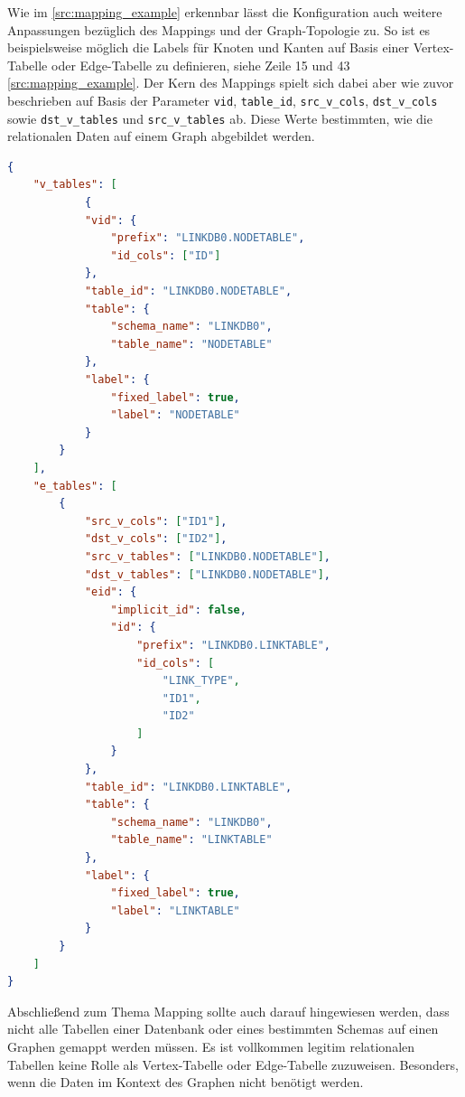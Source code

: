 Wie im \autoref{src:mapping_example} erkennbar lässt die Konfiguration auch weitere Anpassungen bezüglich des Mappings und der Graph-Topologie zu. So ist es beispielsweise möglich die Labels für Knoten und Kanten auf Basis einer Vertex-Tabelle oder Edge-Tabelle zu definieren, siehe Zeile 15 und 43 \autoref{src:mapping_example}. Der Kern des Mappings spielt sich dabei aber wie zuvor beschrieben auf Basis der Parameter \texttt{vid}, \texttt{table\_id}, \texttt{src\_v\_cols}, \texttt{dst\_v\_cols} sowie \texttt{dst\_v\_tables} und \texttt{src\_v\_tables} ab. Diese Werte bestimmten, wie die relationalen Daten auf einem Graph abgebildet werden.

\begin{lstlisting}[caption={Beispiel Auschnitt Mapping Konfiguration},language=json,label=src:mapping_example]
{
    "v_tables": [
            {
            "vid": {
                "prefix": "LINKDB0.NODETABLE",
                "id_cols": ["ID"]
            },
            "table_id": "LINKDB0.NODETABLE",
            "table": {
                "schema_name": "LINKDB0",
                "table_name": "NODETABLE"
            },
            "label": {
                "fixed_label": true,
                "label": "NODETABLE"
            }
        }
    ],
    "e_tables": [
        {
            "src_v_cols": ["ID1"],
            "dst_v_cols": ["ID2"],
            "src_v_tables": ["LINKDB0.NODETABLE"],
            "dst_v_tables": ["LINKDB0.NODETABLE"],
            "eid": {
                "implicit_id": false,
                "id": {
                    "prefix": "LINKDB0.LINKTABLE",
                    "id_cols": [
                        "LINK_TYPE",
                        "ID1",
                        "ID2"
                    ]
                }
            },
            "table_id": "LINKDB0.LINKTABLE",
            "table": {
                "schema_name": "LINKDB0",
                "table_name": "LINKTABLE"
            },
            "label": {
                "fixed_label": true,
                "label": "LINKTABLE"
            }
        }
    ]
}
\end{lstlisting}

Abschließend zum Thema Mapping sollte auch darauf hingewiesen werden, dass nicht alle Tabellen einer Datenbank oder eines bestimmten Schemas auf einen Graphen gemappt werden müssen. Es ist vollkommen legitim relationalen Tabellen keine Rolle als Vertex-Tabelle oder Edge-Tabelle zuzuweisen. Besonders, wenn die Daten im Kontext des Graphen nicht benötigt werden. 

